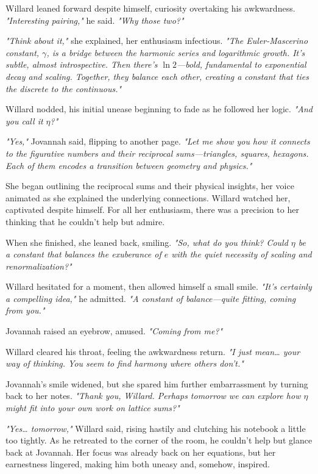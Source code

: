 Willard leaned forward despite himself, curiosity overtaking his awkwardness. \textit{"Interesting pairing,"} he said. \textit{"Why those two?"}

\textit{"Think about it,"} she explained, her enthusiasm infectious. \textit{"The Euler-Mascerino constant, $\gamma$, is a bridge between the harmonic series and logarithmic growth. It’s subtle, almost introspective. Then there’s $\ln 2$—bold, fundamental to exponential decay and scaling. Together, they balance each other, creating a constant that ties the discrete to the continuous."}

Willard nodded, his initial unease beginning to fade as he followed her logic. \textit{"And you call it $\eta$?"}

\textit{"Yes,"} Jovannah said, flipping to another page. \textit{"Let me show you how it connects to the figurative numbers and their reciprocal sums—triangles, squares, hexagons. Each of them encodes a transition between geometry and physics."}

She began outlining the reciprocal sums and their physical insights, her voice animated as she explained the underlying connections. Willard watched her, captivated despite himself. For all her enthusiasm, there was a precision to her thinking that he couldn’t help but admire.

When she finished, she leaned back, smiling. \textit{"So, what do you think? Could $\eta$ be a constant that balances the exuberance of $e$ with the quiet necessity of scaling and renormalization?"}

Willard hesitated for a moment, then allowed himself a small smile. \textit{"It’s certainly a compelling idea,"} he admitted. \textit{"A constant of balance—quite fitting, coming from you."}

Jovannah raised an eyebrow, amused. \textit{"Coming from me?"}

Willard cleared his throat, feeling the awkwardness return. \textit{"I just mean… your way of thinking. You seem to find harmony where others don’t."}

Jovannah’s smile widened, but she spared him further embarrassment by turning back to her notes. \textit{"Thank you, Willard. Perhaps tomorrow we can explore how $\eta$ might fit into your own work on lattice sums?"}

\textit{"Yes… tomorrow,"} Willard said, rising hastily and clutching his notebook a little too tightly. As he retreated to the corner of the room, he couldn’t help but glance back at Jovannah. Her focus was already back on her equations, but her earnestness lingered, making him both uneasy and, somehow, inspired.


